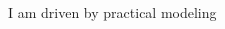 \documentclass{beamer}
\begin{document}
\begin{frame}{I am driven by practical modeling}
\begin{columns}
\begin{column}{0.5\textwidth}
\vspace{10mm}
\end{column}
\begin{column}{0.5\textwidth}
\begin{center}

\end{center}
\end{column}
\end{columns}
\end{frame}
\end{document}
